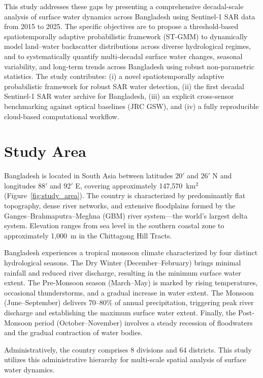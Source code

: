 \documentclass[fleqn,10pt,twocolumn]{article}
\begin{document}
This study addresses these gaps by presenting a comprehensive decadal-scale analysis of surface water dynamics across Bangladesh using Sentinel-1 SAR data from 2015 to 2025. The specific objectives are to propose a threshold-based spatiotemporally adaptive probabilistic framework (ST-GMM) to dynamically model land--water backscatter distributions across diverse hydrological regimes, and to systematically quantify multi-decadal surface water changes, seasonal variability, and long-term trends across Bangladesh using robust non-parametric statistics.
The study contributes: (i) a novel spatiotemporally adaptive probabilistic framework for robust SAR water detection, (ii) the first decadal Sentinel-1 SAR water archive for Bangladesh, (iii) an explicit cross-sensor benchmarking against optical baselines (JRC GSW), and (iv) a fully reproducible cloud-based computational workflow.


\section{Study Area}

Bangladesh is located in South Asia between latitudes 20$'$ and 26$'$ N and longitudes 88$'$ and 92$'$ E, covering approximately 147,570~km$^{2}$ (Figure~\ref{fig:study_area}). The country is characterized by predominantly flat topography, dense river networks, and extensive floodplains formed by the Ganges--Brahmaputra--Meghna (GBM) river system---the world's largest delta system. Elevation ranges from sea level in the southern coastal zone to approximately 1,000~m in the Chittagong Hill Tracts.

Bangladesh experiences a tropical monsoon climate characterized by four distinct hydrological seasons. The Dry Winter (December--February) brings minimal rainfall and reduced river discharge, resulting in the minimum surface water extent. The Pre-Monsoon season (March--May) is marked by rising temperatures, occasional thunderstorms, and a gradual increase in water extent. The Monsoon (June--September) delivers 70--80\% of annual precipitation, triggering peak river discharge and establishing the maximum surface water extent. Finally, the Post-Monsoon period (October--November) involves a steady recession of floodwaters and the gradual contraction of water bodies.

Administratively, the country comprises 8 divisions and 64 districts. This study utilizes this administrative hierarchy for multi-scale spatial analysis of surface water dynamics.
\end{document}
